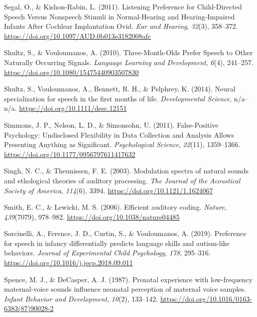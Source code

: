 \documentclass[man,floatsintext]{apa6}
\begin{document}
\leavevmode\hypertarget{ref-segal_listening_2011}{}%
Segal, O., \& Kishon-Rabin, L. (2011). Listening Preference for Child-Directed Speech Versus Nonspeech Stimuli in Normal-Hearing and Hearing-Impaired Infants After Cochlear Implantation Ovid. \emph{Ear and Hearing}, \emph{32}(3), 358--372. \url{https://doi.org/10.1097/AUD.0b013e3182008afc}

\leavevmode\hypertarget{ref-shultz_three-month-olds_2010}{}%
Shultz, S., \& Vouloumanos, A. (2010). Three-Month-Olds Prefer Speech to Other Naturally Occurring Signals. \emph{Language Learning and Development}, \emph{6}(4), 241--257. \url{https://doi.org/10.1080/15475440903507830}

\leavevmode\hypertarget{ref-shultz_neural_2014}{}%
Shultz, S., Vouloumanos, A., Bennett, R. H., \& Pelphrey, K. (2014). Neural specialization for speech in the first months of life. \emph{Developmental Science}, n/a--n/a. \url{https://doi.org/10.1111/desc.12151}

\leavevmode\hypertarget{ref-simmons_false-positive_2011}{}%
Simmons, J. P., Nelson, L. D., \& Simonsohn, U. (2011). False-Positive Psychology: Undisclosed Flexibility in Data Collection and Analysis Allows Presenting Anything as Significant. \emph{Psychological Science}, \emph{22}(11), 1359--1366. \url{https://doi.org/10.1177/0956797611417632}

\leavevmode\hypertarget{ref-singh_modulation_2003}{}%
Singh, N. C., \& Theunissen, F. E. (2003). Modulation spectra of natural sounds and ethological theories of auditory processing. \emph{The Journal of the Acoustical Society of America}, \emph{114}(6), 3394. \url{https://doi.org/10.1121/1.1624067}

\leavevmode\hypertarget{ref-smith_efficient_2006}{}%
Smith, E. C., \& Lewicki, M. S. (2006). Efficient auditory coding. \emph{Nature}, \emph{439}(7079), 978--982. \url{https://doi.org/10.1038/nature04485}

\leavevmode\hypertarget{ref-sorcinelli_preference_2019}{}%
Sorcinelli, A., Ference, J. D., Curtin, S., \& Vouloumanos, A. (2019). Preference for speech in infancy differentially predicts language skills and autism-like behaviors. \emph{Journal of Experimental Child Psychology}, \emph{178}, 295--316. \url{https://doi.org/10.1016/j.jecp.2018.09.011}

\leavevmode\hypertarget{ref-spence_prenatal_1987}{}%
Spence, M. J., \& DeCasper, A. J. (1987). Prenatal experience with low-frequency maternal-voice sounds influence neonatal perception of maternal voice samples. \emph{Infant Behavior and Development}, \emph{10}(2), 133--142. \url{https://doi.org/10.1016/0163-6383(87)90028-2}
\end{document}
